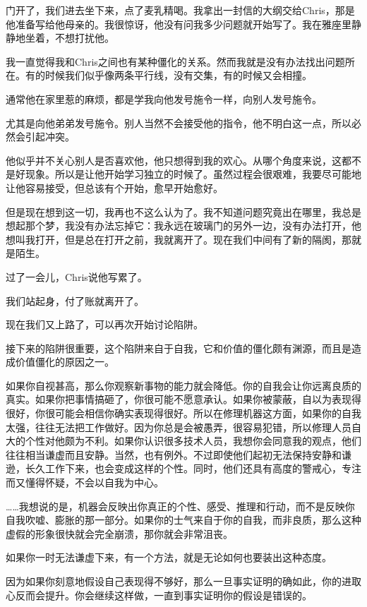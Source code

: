 \documentclass[UTF8]{article}
\begin{document}
\par 门开了，我们进去坐下来，点了麦乳精喝。我拿出一封信的大纲交给Chris，那是他准备写给他母亲的。我很惊讶，他没有问我多少问题就开始写了。我在雅座里静静地坐着，不想打扰他。
\par 我一直觉得我和Chris之间也有某种僵化的关系。然而我就是没有办法找出问题所在。有的时候我们似乎像两条平行线，没有交集，有的时候又会相撞。
\par 通常他在家里惹的麻烦，都是学我向他发号施令一样，向别人发号施令。
\par 尤其是向他弟弟发号施令。别人当然不会接受他的指令，他不明白这一点，所以必然会引起冲突。
\par 他似乎并不关心别人是否喜欢他，他只想得到我的欢心。从哪个角度来说，这都不是好现象。所以是让他开始学习独立的时候了。虽然过程会很艰难，我要尽可能地让他容易接受，但总该有个开始，愈早开始愈好。
\par 但是现在想到这一切，我再也不这么认为了。我不知道问题究竟出在哪里，我总是想起那个梦，我没有办法忘掉它：我永远在玻璃门的另外一边，没有办法打开，他想叫我打开，但是总在打开之前，我就离开了。现在我们中间有了新的隔阂，那就是陌生。
\par 过了一会儿，Chris说他写累了。
\par 我们站起身，付了账就离开了。
\par 现在我们又上路了，可以再次开始讨论陷阱。
\par 接下来的陷阱很重要，这个陷阱来自于自我，它和价值的僵化颇有渊源，而且是造成价值僵化的原因之一。
\par 如果你自视甚高，那么你观察新事物的能力就会降低。你的自我会让你远离良质的真实。如果你把事情搞砸了，你很可能不愿意承认。如果你被蒙蔽，自以为表现得很好，你很可能会相信你确实表现得很好。所以在修理机器这方面，如果你的自我太强，往往无法把工作做好。因为你总是会被愚弄，很容易犯错，所以修理人员自大的个性对他颇为不利。如果你认识很多技术人员，我想你会同意我的观点，他们往往相当谦虚而且安静。当然，也有例外。不过即使他们起初无法保持安静和谦逊，长久工作下来，也会变成这样的个性。同时，他们还具有高度的警戒心，专注而又懂得怀疑，不会以自我为中心。
\par ……我想说的是，机器会反映出你真正的个性、感受、推理和行动，而不是反映你自我吹嘘、膨胀的那一部分。如果你的士气来自于你的自我，而非良质，那么这种虚假的形象很快就会完全崩溃，那你就会非常沮丧。
\par 如果你一时无法谦虚下来，有一个方法，就是无论如何也要装出这种态度。
\par 因为如果你刻意地假设自己表现得不够好，那么一旦事实证明的确如此，你的进取心反而会提升。你会继续这样做，一直到事实证明你的假设是错误的。
\end{document}
